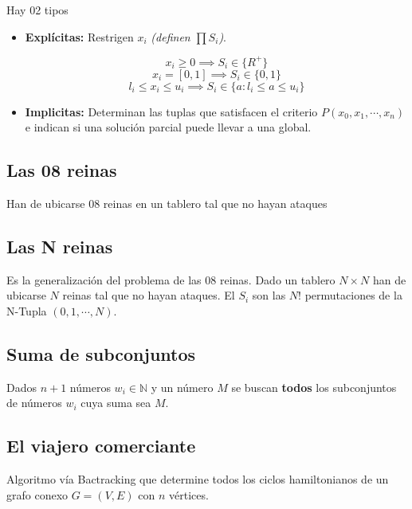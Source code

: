 \begin{definition}
	Hay 02 tipos
	\begin{itemize}
		\item \textbf{Explícitas:} Restrigen $x_i$ \textit{(definen $\prod S_i$)}.
		      \begin{example}
			      $$ x_i\ge0\implies S_i\in \{R^+\} $$
			      $$ x_i=[0,1]\implies S_i\in \{0,1\} $$
			      $$ l_i\le x_i\le u_i\implies S_i\in\{a:l_i\le a\le u_i\} $$
		      \end{example}
		\item \textbf{Implicitas:} Determinan las tuplas que satisfacen el criterio $P(x_0,x_1,\cdots,x_n)$ e indican si una solución parcial puede llevar a una global.
	\end{itemize}
\end{definition}


\subsection{Las 08 reinas}
Han de ubicarse 08 reinas en un tablero tal que no hayan ataques


\subsection{Las N reinas}
Es la generalización del problema de las 08 reinas. Dado un tablero $N\times N$ han de ubicarse $N$ reinas tal que no hayan ataques.
El $S_i$ son las $N!$ permutaciones de la N-Tupla $(0,1, \cdots,N)$.

\subsection{Suma de subconjuntos}
Dados $n+1$ números $w_i\in\mathbb N$ y un número $M$ se buscan \textbf{todos} los subconjuntos de números $w_i$ cuya suma sea $M$.


\subsection{El viajero comerciante}

Algoritmo vía Bactracking que determine todos los ciclos hamiltonianos de un grafo conexo $G=(V,E)$ con $n$ vértices.

